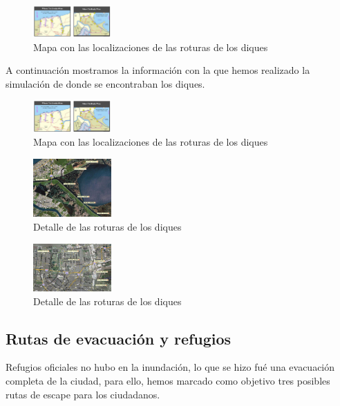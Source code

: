 \begin{figure}[H]
 \centering
 \includegraphics[width=30mm]{figuras/cap6/Roturas de Diques.png}
\caption{Mapa con las localizaciones de las roturas de los diques}
\end{figure}
A continuación mostramos la información con la que hemos realizado la
simulación de donde se encontraban los diques.

\begin{figure}[H]
 \centering
 \includegraphics[width=30mm]{figuras/cap6/Roturas de Diques.png}
\caption{Mapa con las localizaciones de las roturas de los diques}
\end{figure}


\begin{figure}[H]
 \centering
 \includegraphics[width=30mm]{figuras/cap6/Roturas de Diques1.png}
\caption{Detalle de las roturas de los diques}
\end{figure}


\begin{figure}[H]
 \centering
 \includegraphics[width=30mm]{figuras/cap6/Roturas de Diques2.png}
\caption{Detalle de las roturas de los diques}
\end{figure}

\subsection*{Rutas de evacuación y refugios}
Refugios oficiales no hubo en la inundación, lo que se hizo fué una evacuación
completa de la ciudad, para ello, hemos marcado como objetivo tres posibles
rutas de escape para los ciudadanos.

